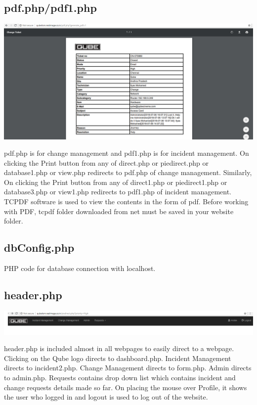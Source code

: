 \documentclass{article}
\begin{document}
\subsection{pdf.php/pdf1.php}
\begin{center}

    \includegraphics[width=7.0in]{pdf.png}
   
    \label{}

\end{center}
pdf.php is for change management and pdf1.php is for incident management. On clicking the Print button from any of direct.php or piedirect.php or database1.php or view.php redirects to pdf.php of change management. Similarly, On clicking the Print button from any of direct1.php or piedirect1.php or database3.php or view1.php redirects to pdf1.php of incident management. TCPDF software is used to view the contents in the form of pdf. Before working with PDF, tcpdf folder downloaded from net must be saved in your website folder. 
\subsection{dbConfig.php}
PHP code for database connection with localhost.
\subsection{header.php}
\begin{center}

    \includegraphics[width=7.0in]{header.png}
   
    \label{}

\end{center}
header.php is included almost in all webpages to easily direct to a webpage. Clicking on the Qube logo directs to dashboard.php. Incident Management directs to incident2.php. Change Management directs to form.php. Admin directs to admin.php. Requests contains drop down list which contains incident and change requests details made so far. On placing the mouse over Profile, it shows the user who logged in and logout is used to log out of the website.
\end{document}
